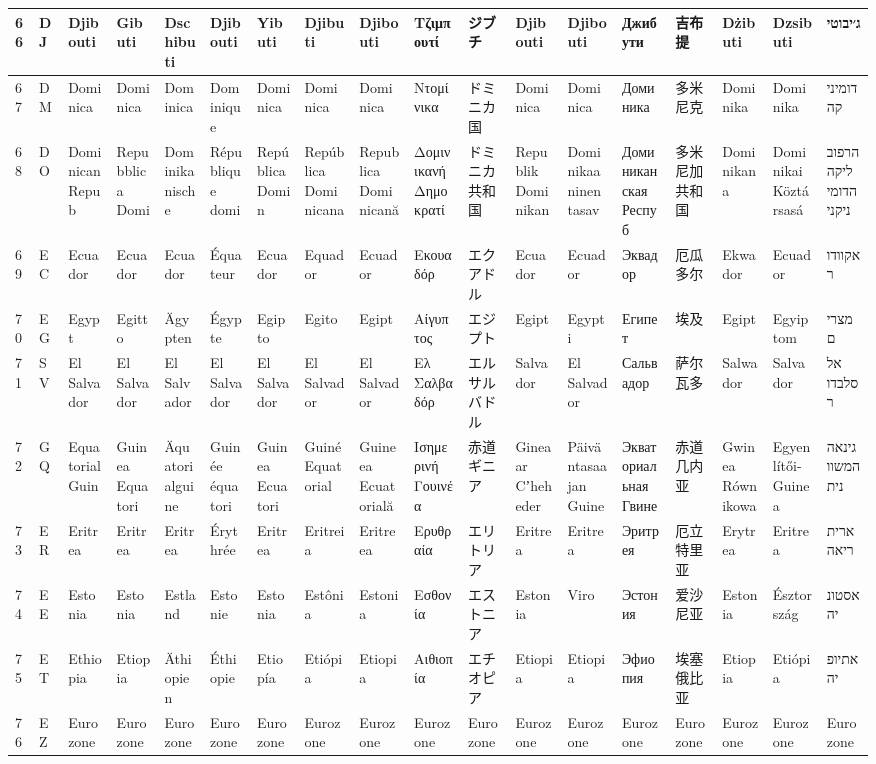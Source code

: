 \begin{longtable}{|l|l|l|l|l|l|l|l|l|l|l|l|l|l|l|l|l|l|}
66 & DJ & Djibouti & Gibuti & Dschibuti & Djibouti & Yibuti & Djibuti & Djibouti & Τζιμπουτί & ジブチ & Djibouti & Djibouti & Джибути & 吉布提 & Dżibuti & Dzsibuti & ג׳יבוטי \\ \hline 
67 & DM & Dominica & Dominica & Dominica & Dominique & Dominica & Dominica & Dominica & Ντομίνικα & ドミニカ国 & Dominica & Dominica & Доминика & 多米尼克 & Dominika & Dominika & דומיניקה \\ \hline 
68 & DO & Dominican Repub & Repubblica Domi & Dominikanische  & République domi & República Domin & República Dominicana & Republica Dominicană & Δομινικανή Δημοκρατί & ドミニカ共和国 & Republik Dominikan & Dominikaaninen tasav & Доминиканская Респуб & 多米尼加共和国 & Dominikana & Dominikai Köztársasá & הרפובליקה הדומיניקני \\ \hline 
69 & EC & Ecuador & Ecuador & Ecuador & Équateur & Ecuador & Equador & Ecuador & Εκουαδόρ & エクアドル & Ecuador & Ecuador & Эквадор & 厄瓜多尔 & Ekwador & Ecuador & אקוודור \\ \hline 
70 & EG & Egypt & Egitto & Ägypten & Égypte & Egipto & Egito & Egipt & Αίγυπτος & エジプト & Egipt & Egypti & Египет & 埃及 & Egipt & Egyiptom & מצרים \\ \hline 
71 & SV & El Salvador & El Salvador & El Salvador & El Salvador & El Salvador & El Salvador & El Salvador & Ελ Σαλβαδόρ & エルサルバドル & Salvador & El Salvador & Сальвадор & 萨尔瓦多 & Salwador & Salvador & אל סלבדור \\ \hline 
72 & GQ & Equatorial Guin & Guinea Equatori & Äquatorialguine & Guinée équatori & Guinea Ecuatori & Guiné Equatorial & Guineea Ecuatorială & Ισημερινή Γουινέα & 赤道ギニア & Ginea ar Cʼheheder & Päiväntasaajan Guine & Экваториальная Гвине & 赤道几内亚 & Gwinea Równikowa & Egyenlítői-Guinea & גינאה המשוונית \\ \hline 
73 & ER & Eritrea & Eritrea & Eritrea & Érythrée & Eritrea & Eritreia & Eritreea & Ερυθραία & エリトリア & Eritrea & Eritrea & Эритрея & 厄立特里亚 & Erytrea & Eritrea & אריתריאה \\ \hline 
74 & EE & Estonia & Estonia & Estland & Estonie & Estonia & Estônia & Estonia & Εσθονία & エストニア & Estonia & Viro & Эстония & 爱沙尼亚 & Estonia & Észtország & אסטוניה \\ \hline 
75 & ET & Ethiopia & Etiopia & Äthiopien & Éthiopie & Etiopía & Etiópia & Etiopia & Αιθιοπία & エチオピア & Etiopia & Etiopia & Эфиопия & 埃塞俄比亚 & Etiopia & Etiópia & אתיופיה \\ \hline 
76 & EZ & Eurozone & Eurozone & Eurozone & Eurozone & Eurozone & Eurozone & Eurozone & Eurozone & Eurozone & Eurozone & Eurozone & Eurozone & Eurozone & Eurozone & Eurozone & Eurozone \\ \hline 

\end{longtable}
